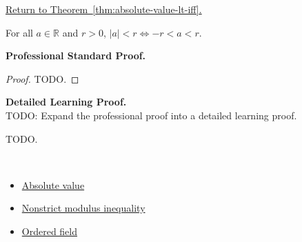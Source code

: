 \newpage
{}
\label{prf:absolute-value-lt-iff}

\begin{remark*}[Return]
\hyperref[thm:absolute-value-lt-iff]{Return to Theorem~\ref*{thm:absolute-value-lt-iff}.}
\end{remark*}

\begin{theorem*}
For all $a \in \mathbb{R}$ and $r > 0$,
$\lvert a \rvert < r \iff -r < a < r$.
\end{theorem*}

\textbf{Professional Standard Proof.}~\\
\begin{proof}
TODO.
\end{proof}

\textbf{Detailed Learning Proof.}~\\
TODO: Expand the professional proof into a detailed learning proof.


\begin{remark*}
TODO.
\end{remark*}

\begin{remark*}[Dependencies]~\\
\begin{itemize}
  \item \hyperref[def:absolute-value]{Absolute value}
  \item \hyperref[thm:absolute-value-le-iff]{Nonstrict modulus inequality}
  \item \hyperref[def:ordered-field]{Ordered field}
\end{itemize}
\end{remark*}
